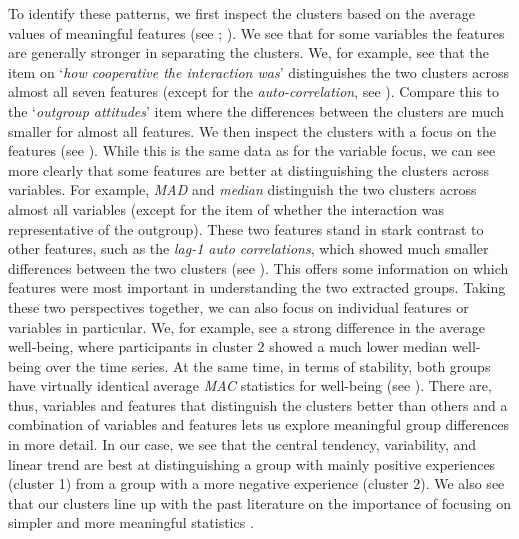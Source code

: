 To identify these patterns, we first inspect the clusters based on the
average values of meaningful features (see
; \citealp{Kennedy2021}). We see that for
some variables the features are generally stronger in separating the
clusters. We, for example, see that the item on
`\textit{how cooperative the interaction was}' distinguishes the two
clusters across almost all seven features (except for the
\textit{auto-correlation}, see ). Compare
this to the `\textit{outgroup attitudes}' item where the differences
between the clusters are much smaller for almost all features. We then
inspect the clusters with a focus on the features (see
). While this is the same data as for the
variable focus, we can see more clearly that some features are better at
distinguishing the clusters across variables. For example, \textit{MAD}
and \textit{median} distinguish the two clusters across almost all
variables (except for the item of whether the interaction was
representative of the outgroup). These two features stand in stark
contrast to other features, such as the
\textit{lag-1 auto correlations}, which showed much smaller differences
between the two clusters (see ). This
offers some information on which features were most important in
understanding the two extracted groups. Taking these two perspectives
together, we can also focus on individual features or variables in
particular. We, for example, see a strong difference in the average
well-being, where participants in cluster 2 showed a much lower median
well-being over the time series. At the same time, in terms of
stability, both groups have virtually identical average \textit{MAC}
statistics for well-being (see ). There
are, thus, variables and features that distinguish the clusters better
than others and a combination of variables and features lets us explore
meaningful group differences in more detail. In our case, we see that
the central tendency, variability, and linear trend are best at
distinguishing a group with mainly positive experiences (cluster 1) from
a group with a more negative experience (cluster 2). We also see that
our clusters line up with the past literature on the importance of
focusing on simpler and more meaningful statistics
\citep{bringmann2018c, eronen2021a}.

